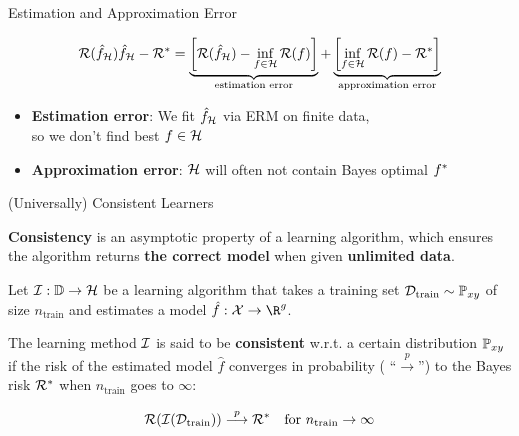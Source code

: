 \documentclass[11pt,compress,t,notes=noshow, xcolor=table]{beamer}
\begin{document}
\begin{frame}{Estimation and Approximation Error} 







$$
\mathcal{R}(\hat f_{\mathcal{H}}) \hat f_{\mathcal{H}} - \mathcal{R}^\ast = \underbrace{\left[\mathcal{R}(\hat f_{\mathcal{H}}) - \inf_{f \in \mathcal{H}} \mathcal{R}(f)\right]}_{\text{estimation error}} + \underbrace{\left[\inf_{f \in \mathcal{H}} \mathcal{R}(f) - \mathcal{R}^\ast\right]}_{\text{approximation error}}  
$$

\vfill

\begin{itemize}
\item \textbf{Estimation error}:
We fit $\hat f_{\mathcal{H}}$ via ERM on finite data, \\
so we don't find best $f \in \mathcal{H}$
\item \textbf{Approximation error}: 
$\mathcal{H}$ will often not contain Bayes optimal $f^{\ast}$ 
\end{itemize}

\end{frame}


\begin{frame}{(Universally) Consistent Learners }

\textbf{Consistency} is an asymptotic property of a learning algorithm, which ensures the algorithm returns \textbf{the correct model} when given \textbf{unlimited data}.

\vfill 

Let $\mathcal{I}:\mathbb{D} \to \mathcal{H}$ be a learning algorithm that takes a training set $\mathcal{D}_{\text{train}} \sim \mathbb{P}_{xy}$ of size $n_\text{train}$ and estimates a model $\hat f: \Xspace \to \R^g$. 

\vfill 

The learning method $\mathcal{I}$ is said to be \textbf{consistent} w.r.t. a certain distribution $\mathbb{P}_{xy}$ if the risk of the estimated model $\hat f$ converges in probability ( \enquote{$\overset{p}{\longrightarrow}$}) to the Bayes risk $\mathcal{R}^\ast$ when $n_\text{train}$ goes to $\infty$: 

$$
	\mathcal{R}(\mathcal{I}(\mathcal{D}_{\text{train}})) \overset{p}{\longrightarrow} \mathcal{R}^\ast \quad \text{for } n_\text{train} \to \infty
$$

\end{frame}
\end{document}
